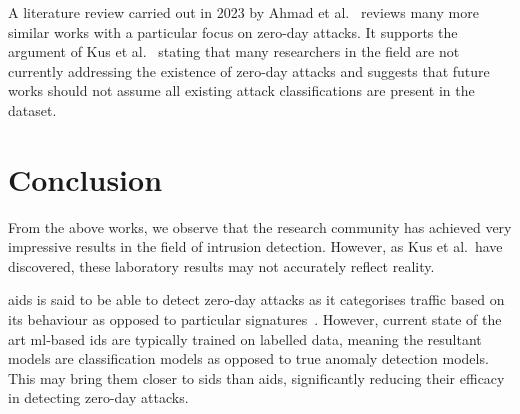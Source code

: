 A literature review carried out in 2023 by Ahmad et al.~\cite{zero-day} reviews
many more similar works with a particular focus on zero-day attacks. It
supports the argument of Kus et al.~\cite{Kus} stating that many researchers in
the field are not currently addressing the existence of zero-day attacks and
suggests that future works should not assume all existing attack
classifications are present in the dataset.

\section{Conclusion}%
\label{sec:conclusion}
From the above works, we observe that the research community has achieved
very impressive results in the field of intrusion detection. However, as Kus et
al.\ have discovered, these laboratory results may not accurately reflect
reality.

\gls{aids} is said to be able to detect zero-day attacks as it categorises
traffic based on its behaviour as opposed to particular
signatures~\cite{aids-zero-day}. However, current state of the art
\gls{ml}-based \gls{ids} are typically trained on labelled data, meaning the
resultant models are classification models as opposed to true anomaly detection
models. This may bring them closer to \gls{sids} than \gls{aids}, significantly
reducing their efficacy in detecting zero-day attacks.
